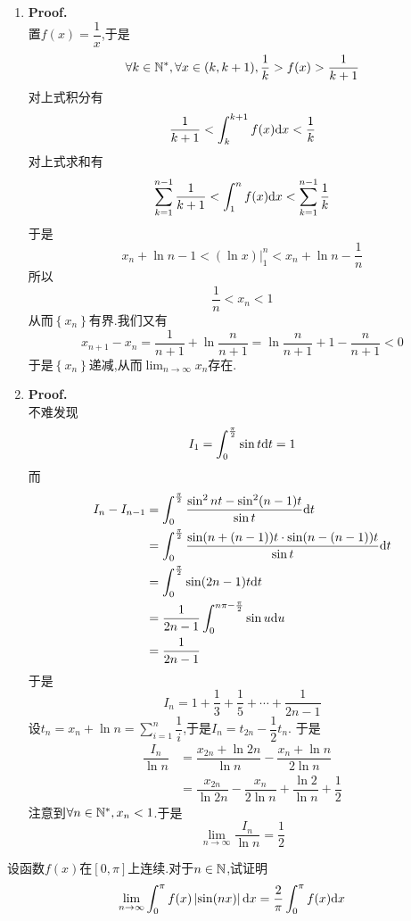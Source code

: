 \documentclass{ctexart}
\begin{document}
\begin{solution}
    \begin{enumerate}[label=\textbf{(\arabic*)}]
        \item \textbf{Proof.}\\
            置$f(x)=\dfrac{1}{x}$,于是$$\forall k\in\mathbb{N}^*,\forall x\in(k,k+1),\dfrac{1}{k}>f(x)>\dfrac{1}{k+1}$$
            对上式积分有$$\dfrac{1}{k+1}<\int_{k}^{k+1}f(x)\mathrm{d} x<\dfrac{1}{k}$$
            对上式求和有$$\sum_{k=1}^{n-1}\dfrac{1}{k+1}<\int_1^nf(x)\mathrm{d} x<\sum_{k=1}^{n-1}\dfrac{1}{k}$$
            于是$$x_n+\ln n-1<\left.(\ln x)\right|_1^n<x_n+\ln n-\dfrac{1}{n}$$
            所以$$\dfrac{1}{n}<x_n<1$$
            从而$\left\{x_n\right\}$有界.我们又有
            $$x_{n+1}-x_n=\dfrac{1}{n+1}+\ln\dfrac{n}{n+1}=\ln\dfrac{n}{n+1}+1-\dfrac{n}{n+1}<0$$
            于是$\left\{x_n\right\}$递减,从而$\displaystyle\lim_{n\to\infty}x_n$存在.
        \item \textbf{Proof.}\\
            不难发现$$I_1=\int_0^{\frac{\pi}{2}}\sin t\mathrm{d} t=1$$
            而
            $$\begin{aligned}
                I_n-I_{n-1}
                &= \int_0^{\frac{\pi}{2}}\dfrac{\sin^2nt-\sin^2(n-1)t}{\sin t}\mathrm{d} t \\
                &= \int_0^{\frac{\pi}{2}}\dfrac{\sin(n+(n-1))t\cdot\sin(n-(n-1))t}{\sin t}\mathrm{d} t \\
                &= \int_0^{\frac{\pi}{2}}\sin(2n-1)t\mathrm{d} t \\
                &= \dfrac{1}{2n-1}\int_0^{n\pi-\frac{\pi}{2}}\sin u\mathrm{d} u \\
                &= \dfrac{1}{2n-1}
            \end{aligned}$$
            于是$$I_n=1+\dfrac{1}{3}+\dfrac{1}{5}+\cdots+\dfrac{1}{2n-1}$$
            设$\displaystyle t_n=x_n+\ln n=\sum_{i=1}^n\dfrac{1}{i}$,于是$I_n=t_{2n}-\dfrac{1}{2}t_n$.
            于是$$\begin{aligned}
                \dfrac{I_n}{\ln n}
                &= \dfrac{x_{2n}+\ln2n}{\ln n}-\dfrac{x_n+\ln n}{2\ln n} \\
                &= \dfrac{x_{2n}}{\ln2n}-\dfrac{x_n}{2\ln n}+\dfrac{\ln 2}{\ln n}+\dfrac{1}{2}
            \end{aligned}$$
            注意到$\forall n\in\mathbb{N}^*,x_n<1$.于是$$\lim_{n\to\infty}\dfrac{I_n}{\ln n}=\dfrac{1}{2}$$
    \end{enumerate}
\end{solution}
\begin{problem}[8.(15\songti 分)]
    设函数$f(x)$在$[0,\pi]$上连续.对于$n\in\mathbb{N}$,试证明$$\lim_{n\to\infty}\int_{0}^{\pi}f(x)\left|\sin(nx)\right|\mathrm{d} x=\dfrac{2}{\pi}\int_0^\pi f(x)\mathrm{d} x$$
\end{problem}
\end{document}
